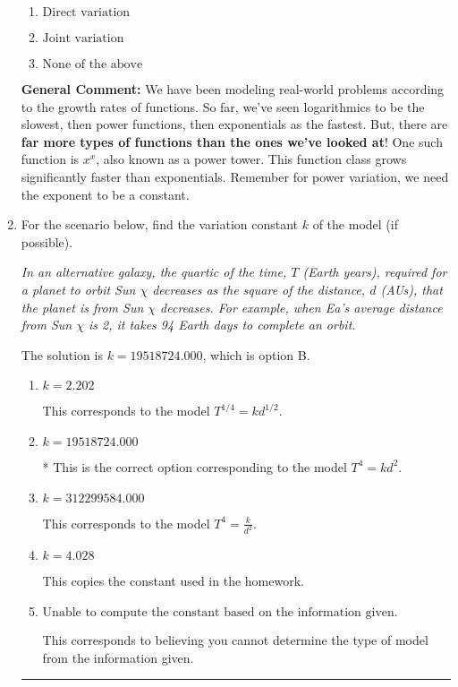 \documentclass{extbook}[14pt]
\newcommand{\litem}[1]{\item #1

\rule{\textwidth}{0.4pt}}
\begin{document}
\begin{enumerate}
{\begin{enumerate}[label=\Alph*.]
\item \( \text{Direct variation} \)


\item \( \text{Joint variation} \)


\item \( \text{None of the above} \)


\end{enumerate}

\textbf{General Comment:} We have been modeling real-world problems according to the growth rates of functions. So far, we've seen logarithmics to be the slowest, then power functions, then exponentials as the fastest. But, there are \textbf{far more types of functions than the ones we've looked at}! One such function is $x^x$, also known as a power tower. This function class grows significantly faster than exponentials. Remember for power variation, we need the exponent to be a constant.
}
\litem{
For the scenario below, find the variation constant $k$ of the model (if possible).

\begin{center}
    \textit{ In an alternative galaxy, the quartic of the time, $T$ (Earth years), required for a planet to orbit Sun $\chi$ decreases as the square of the distance, $d$ (AUs), that the planet is from Sun $\chi$ decreases. For example, when Ea's average distance from Sun $\chi$ is 2, it takes 94 Earth days to complete an orbit. }
\end{center}
The solution is \( k = 19518724.000 \), which is option B.\begin{enumerate}[label=\Alph*.]
\item \( k = 2.202 \)

This corresponds to the model $T^{1/4} = k d^{1/2}$.
\item \( k = 19518724.000 \)

* This is the correct option corresponding to the model $T^{4} = k d^{2}$.
\item \( k = 312299584.000 \)

This corresponds to the model $T^{4} = \frac{k}{d^{2}}$.
\item \( k = 4.028 \)

This copies the constant used in the homework.
\item \( \text{Unable to compute the constant based on the information given.} \)

This corresponds to believing you cannot determine the type of model from the information given.
\end{enumerate}

}
\end{enumerate}
\end{document}
